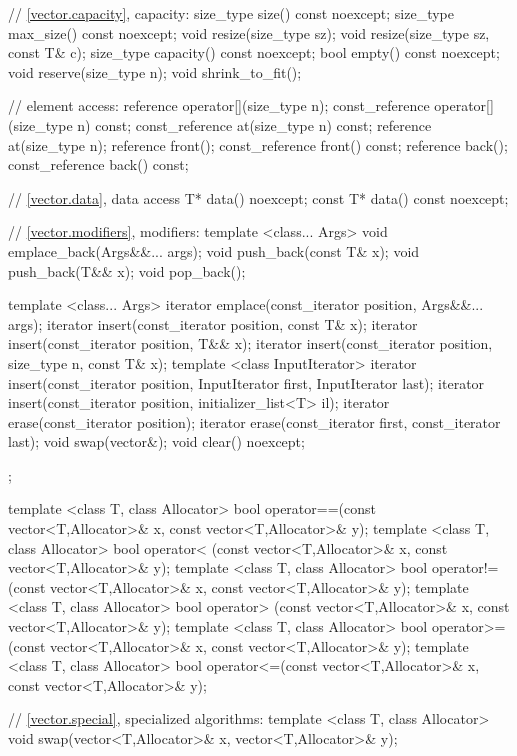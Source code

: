 \begin{codeblock}
{{    // \ref{vector.capacity}, capacity:
    size_type size() const noexcept;
    size_type max_size() const noexcept;
    void      resize(size_type sz);
    void      resize(size_type sz, const T& c);
    size_type capacity() const noexcept;
    bool      empty() const noexcept;
    void      reserve(size_type n);
    void      shrink_to_fit();

    // element access:
    reference       operator[](size_type n);
    const_reference operator[](size_type n) const;
    const_reference at(size_type n) const;
    reference       at(size_type n);
    reference       front();
    const_reference front() const;
    reference       back();
    const_reference back() const;

    // \ref{vector.data}, data access
    T*         data() noexcept;
    const T*  data() const noexcept;

    // \ref{vector.modifiers}, modifiers:
    template <class... Args> void emplace_back(Args&&... args);
    void push_back(const T& x);
    void push_back(T&& x);
    void pop_back();

    template <class... Args> iterator emplace(const_iterator position, Args&&... args);
    iterator insert(const_iterator position, const T& x);
    iterator     insert(const_iterator position, T&& x);
    iterator     insert(const_iterator position, size_type n, const T& x);
    template <class InputIterator>
        iterator insert(const_iterator position,
                        InputIterator first, InputIterator last);
    iterator     insert(const_iterator position, initializer_list<T> il);
    iterator erase(const_iterator position);
    iterator erase(const_iterator first, const_iterator last);
    void     swap(vector&);
    void     clear() noexcept;
  };

  template <class T, class Allocator>
    bool operator==(const vector<T,Allocator>& x, const vector<T,Allocator>& y);
  template <class T, class Allocator>
    bool operator< (const vector<T,Allocator>& x, const vector<T,Allocator>& y);
  template <class T, class Allocator>
    bool operator!=(const vector<T,Allocator>& x, const vector<T,Allocator>& y);
  template <class T, class Allocator>
    bool operator> (const vector<T,Allocator>& x, const vector<T,Allocator>& y);
  template <class T, class Allocator>
    bool operator>=(const vector<T,Allocator>& x, const vector<T,Allocator>& y);
  template <class T, class Allocator>
    bool operator<=(const vector<T,Allocator>& x, const vector<T,Allocator>& y);

  // \ref{vector.special}, specialized algorithms:
  template <class T, class Allocator>
    void swap(vector<T,Allocator>& x, vector<T,Allocator>& y);
}
\end{codeblock}%
%


